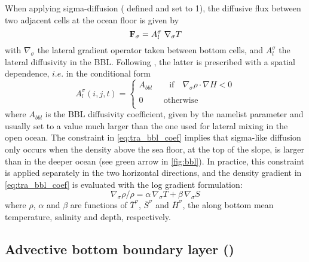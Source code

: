 \documentclass[../tex_main/NEMO_manual]{subfiles}
\begin{document}
When applying sigma-diffusion ( defined and  set to 1), 
the diffusive flux between two adjacent cells at the ocean floor is given by 
\begin{equation} \label{eq:tra_bbl_diff}
{\rm {\bf F}}_\sigma=A_l^\sigma \; \nabla_\sigma T
\end{equation} 
with $\nabla_\sigma$ the lateral gradient operator taken between bottom cells, 
and  $A_l^\sigma$ the lateral diffusivity in the BBL. Following \citet{Beckmann_Doscher1997}, 
the latter is prescribed with a spatial dependence, $i.e.$ in the conditional form
\begin{equation} \label{eq:tra_bbl_coef}
A_l^\sigma (i,j,t)=\left\{ {\begin{array}{l}
 A_{bbl}  \quad \quad   \mbox{if}  \quad   \nabla_\sigma \rho  \cdot  \nabla H<0 \\ 
 \\
 0\quad \quad \;\,\mbox{otherwise} \\ 
 \end{array}} \right.
\end{equation} 
where $A_{bbl}$ is the BBL diffusivity coefficient, given by the namelist 
parameter  and usually set to a value much larger 
than the one used for lateral mixing in the open ocean. The constraint in \autoref{eq:tra_bbl_coef} 
implies that sigma-like diffusion only occurs when the density above the sea floor, at the top of 
the slope, is larger than in the deeper ocean (see green arrow in \autoref{fig:bbl}). 
In practice, this constraint is applied separately in the two horizontal directions, 
and the density gradient in \autoref{eq:tra_bbl_coef} is evaluated with the log gradient formulation: 
\begin{equation} \label{eq:tra_bbl_Drho}
	\nabla_\sigma \rho / \rho = \alpha \,\nabla_\sigma T + \beta   \,\nabla_\sigma S
\end{equation} 
where $\rho$, $\alpha$ and $\beta$ are functions of $\overline{T}^\sigma$, 
$\overline{S}^\sigma$ and $\overline{H}^\sigma$, the along bottom mean temperature, 
salinity and depth, respectively.

\subsection{Advective bottom boundary layer  (\protect{})}
\label{subsec:TRA_bbl_adv}
\end{document}

